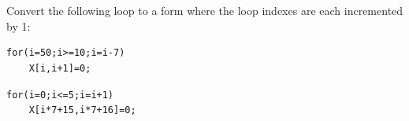 \documentclass[11pt]{article}
\begin{document}
\section{}

Convert the following loop to a form where the loop indexes are each incremented by 1:
\begin{verbatim}
for(i=50;i>=10;i=i-7) 
    X[i,i+1]=0;
\end{verbatim}

\begin{Answer}
\begin{verbatim}
for(i=0;i<=5;i=i+1) 
    X[i*7+15,i*7+16]=0;
\end{verbatim}
\end{Answer}
\newpage
\end{document}
